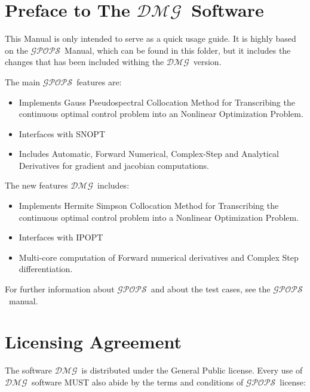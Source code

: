 \documentclass[10pt,final]{report}
\newcommand{\dmg}{$\mathcal{DMG}$~}
\newcommand{\gpops}{$\mathcal{GPOPS}$~}
\begin{document}
\chapter*{Preface to The \dmg Software}

This Manual is only intended to serve as a quick usage guide. It is highly based on the \gpops Manual, which can be found in this folder, but it includes the changes that has been included withing the \dmg version.

The main \gpops features are:
\begin{itemize}
\item Implements Gauss Pseudospectral Collocation Method for Transcribing the continuous optimal control problem into an Nonlinear Optimization Problem.
\item Interfaces with SNOPT
\item Includes Automatic, Forward Numerical, Complex-Step and Analytical Derivatives for gradient and jacobian computations.
\end{itemize}
The new features \dmg includes:
\begin{itemize}
\item Implements Hermite Simpson Collocation Method for Transcribing the continuous optimal control problem into a Nonlinear Optimization Problem.
\item Interfaces with IPOPT
\item Multi-core computation of Forward numerical derivatives and Complex Step differentiation.
\end{itemize}

For further information about \gpops and about the test cases, see the \gpops manual.



\chapter*{Licensing Agreement}

The software \dmg is distributed under the General Public license. Every use of \dmg software MUST also abide by the terms and conditions of \gpops license:
\end{document}
